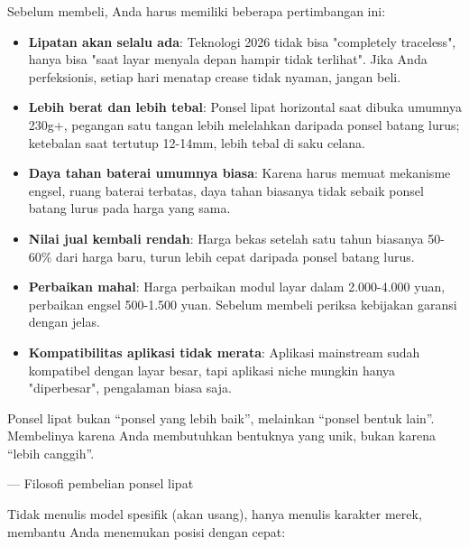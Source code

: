 
Sebelum membeli, Anda harus memiliki beberapa pertimbangan ini:

\begin{itemize}
  \item \textbf{Lipatan akan selalu ada}: Teknologi 2026 tidak bisa "completely traceless", hanya bisa "saat layar menyala depan hampir tidak terlihat". Jika Anda perfeksionis, setiap hari menatap crease tidak nyaman, jangan beli.
  \item \textbf{Lebih berat dan lebih tebal}: Ponsel lipat horizontal saat dibuka umumnya 230g+, pegangan satu tangan lebih melelahkan daripada ponsel batang lurus; ketebalan saat tertutup 12-14mm, lebih tebal di saku celana.
  \item \textbf{Daya tahan baterai umumnya biasa}: Karena harus memuat mekanisme engsel, ruang baterai terbatas, daya tahan biasanya tidak sebaik ponsel batang lurus pada harga yang sama.
  \item \textbf{Nilai jual kembali rendah}: Harga bekas setelah satu tahun biasanya 50-60\% dari harga baru, turun lebih cepat daripada ponsel batang lurus.
  \item \textbf{Perbaikan mahal}: Harga perbaikan modul layar dalam 2.000-4.000 yuan, perbaikan engsel 500-1.500 yuan. Sebelum membeli periksa kebijakan garansi dengan jelas.
  \item \textbf{Kompatibilitas aplikasi tidak merata}: Aplikasi mainstream sudah kompatibel dengan layar besar, tapi aplikasi niche mungkin hanya "diperbesar", pengalaman biasa saja.
\end{itemize}

Ponsel lipat bukan “ponsel yang lebih baik”, melainkan “ponsel bentuk lain”. Membelinya karena Anda membutuhkan bentuknya yang unik, bukan karena “lebih canggih”.

— Filosofi pembelian ponsel lipat


Tidak menulis model spesifik (akan usang), hanya menulis karakter merek, membantu Anda menemukan posisi dengan cepat:

